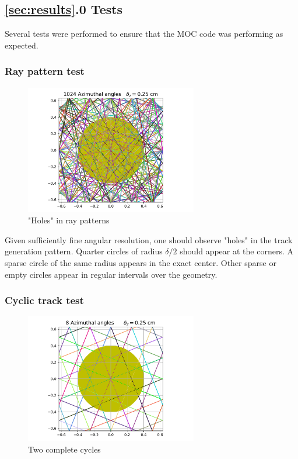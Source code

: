 \documentclass[12pt]{article}
\begin{document}
\subsection*{\ref{sec:results}.0\hspace{10pt} Tests}\label{sec:tests}

Several tests were performed to ensure that the MOC code was performing as expected.

\subsubsection{Ray pattern test}

\begin{figure}[h]
\centering
\includegraphics[width=0.67\textwidth]{figs/1024_angles.pdf}
\caption{"Holes" in ray patterns}
\label{fig:holes}
\end{figure}

Given sufficiently fine angular resolution, one should observe "holes" in the track generation pattern. Quarter circles of radius $\delta/2$ should appear at the corners. A sparse circle of the same radius appears in the exact center. Other sparse or empty circles appear in regular intervals over the geometry.

\subsubsection{Cyclic track test}\label{sec:testcyclic}

\begin{figure}[H]
\centering
\includegraphics[width=0.67\textwidth]{figs/8_angles.pdf}
\caption{Two complete cycles}
\label{fig:cyclictracks}
\end{figure}
\end{document}
